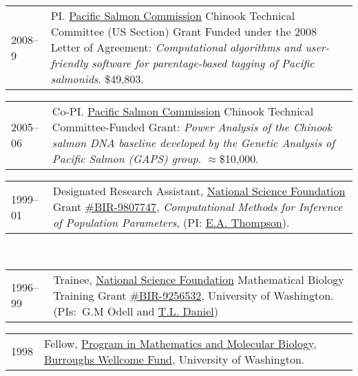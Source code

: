 \documentclass[11pt]{article}
\newlength{\myindent}
\newlength{\scndcol}
\begin{document}
\begin{tabular}{ @{}p{2.5\myindent} p{\scndcol}@{}  }
\hspace*{\myindent}2008--9 &  PI. \href{http://www.psc.org/}{Pacific Salmon Commission} Chinook Technical Committee (US Section) Grant Funded under the 2008 Letter of Agreement: {\em Computational algorithms and user-friendly software for parentage-based tagging of Pacific salmonids}.   \$49,803.\\
\end{tabular}

\begin{tabular}{ @{}p{2.5\myindent} p{\scndcol}@{}  }
\hspace*{\myindent}2005--06 &  Co-PI. \href{http://www.psc.org/}{Pacific Salmon Commission} Chinook Technical Committee-Funded Grant: {\em Power Analysis of the Chinook salmon DNA baseline developed by the Genetic Analysis of Pacific Salmon (GAPS) group}.  $\approx$\$10,000.  \\
\end{tabular}

\begin{tabular}{ @{}p{2.5\myindent} p{\scndcol}@{}  }
\hspace*{\myindent}1999--01 &  Designated Research Assistant, \href{http://www.nsf.gov/}{National Science Foundation} Grant
\href{http://www.fastlane.nsf.gov/servlet/showaward?award=9807747}{\#BIR-9807747}, {\em Computational Methods for Inference of Population
Parameters}, (PI: \href{http://www.stat.washington.edu/thompson/}{E.A. Thompson}).   \\
\end{tabular}\\
\begin{tabular}{ @{}p{2.5\myindent} p{\scndcol}@{}  }
\hspace*{\myindent}1996--99  &  Trainee, \href{http://www.nsf.gov/}{National Science Foundation}
Mathematical Biology Training Grant \href{http://www.fastlane.nsf.gov/servlet/showaward?award=9256532}{\#BIR-9256532}, University of Washington.  (PIs:~G.M
         Odell and \href{http://faculty.washington.edu/danielt/}{T.L.
         Daniel})\\
\end{tabular}

\begin{tabular}{ @{}p{2.5\myindent} p{\scndcol}@{}  }
\hspace*{\myindent}1998   &  Fellow, \href{http://www.math.fsu.edu/~pmmb/}{Program in Mathematics and Molecular Biology}, \href{http://www.bwfund.org/}{Burroughs
Wellcome Fund}, University of Washington.
\end{tabular}
\end{document}
